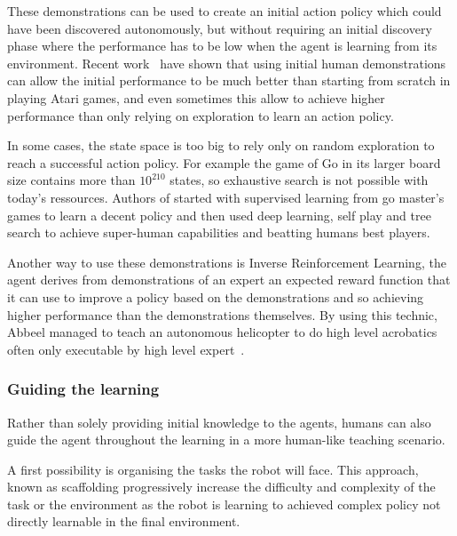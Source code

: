 \documentclass[letterpaper]{article} %
\begin{document}
These demonstrations can be used to create an initial action policy which could
have been discovered autonomously, but without requiring an initial discovery
phase where the performance has to be low when the agent is learning from its
environment. Recent work~\cite{hester2017learning} have shown that using initial
human demonstrations can allow the initial performance to be much better than
starting from scratch in playing Atari games, and even sometimes this allow to
achieve higher performance than only relying on exploration to learn an action
policy.

In some cases, the state space is too big to rely only on random exploration to
reach a successful action policy. For example the game of Go in its larger board
size contains more than $10^{210}$ states, so exhaustive search is not possible
with today's ressources. Authors of \cite{silver2016mastering} started with
supervised learning from go master's games to learn a decent policy and then
used deep learning, self play and tree search to achieve super-human
capabilities and beatting humans best players.

Another way to use these demonstrations is Inverse
Reinforcement Learning, the agent derives from demonstrations of an expert an
expected reward function that it can use to improve a policy based on the
demonstrations and so achieving higher performance than the demonstrations
themselves. By using this technic, Abbeel managed to teach an autonomous
helicopter to do high level acrobatics often only executable by high level
expert~\cite{abbeel2004apprenticeship}. 


\subsubsection{Guiding the learning}
Rather than solely providing initial knowledge to the agents, humans can also guide the
agent throughout the learning in a more human-like teaching scenario. 

A first possibility is organising the tasks the robot will face. 
This approach, known as scaffolding \cite{saunders2006teaching} progressively
increase the difficulty and complexity of the task or the environment as the
robot is learning to achieved complex policy not directly learnable in the final
environment.
\end{document}
